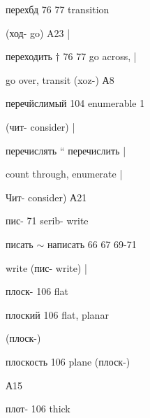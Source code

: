 \begin{minipage}[t]{0.475\textwidth}
\noindent перехбд 76 77 transition\par
\noindent (ход- go) A23 |\par
\noindent переходить $\dagger$ 76 77 go across, |\par
\noindent go over, transit (xoz-) А8\par
\noindent перечйслимый 104 enumerable 1\par
\noindent (чит- consider) |\par
\noindent перечислять “ перечислить |\par
{} count through, enumerate |\par
\noindent Чит- consider) А21\par
\noindent пис- 71 serib- write\par
\noindent писать $\sim$ написать 66 67 69-71\par
\noindent write (пис- write) |\par
\noindent плоск- 106 flat\par
\noindent плоский 106 flat, planar\par
\noindent (плоск-)\par
\noindent плоскость 106 plane (плоск-)\par
\noindent А15\par
\noindent плот- 106 thick\par
\end{minipage}\hfill
